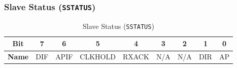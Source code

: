     \subsubsection{Slave Status (\texttt{SSTATUS})}
    \label{sec:sstatus}
    
    \begin{table}[H]
        \centering
        \caption{Slave Status (\texttt{SSTATUS})}
        \begin{tabular}{@{}ccccccccc@{}}
            \toprule
            \textbf{Bit} & 7 & 6 & 5 & 4 & 3 & 2 & 1 & 0 \\ \midrule
            \textbf{Name} & DIF & APIF & CLKHOLD & RXACK & N/A & N/A & DIR & AP \\ \bottomrule
        \end{tabular}
        \label{tab:sstatus}
    \end{table}
    
